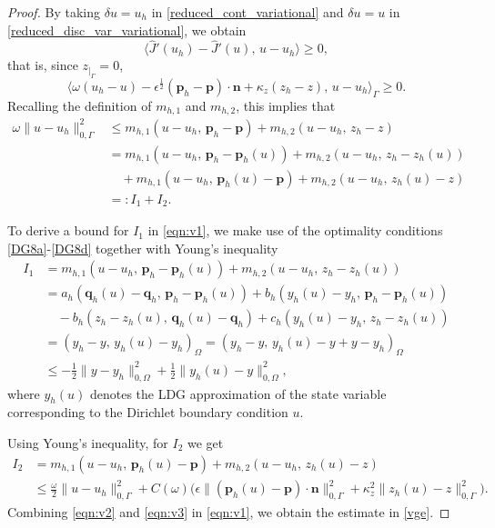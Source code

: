 \documentclass[a4paper,10pt]{article}
\newcommand{\hF}{{\frac{1}{2}}}
\newcommand{\bq}{{\mathbf{q}}}
\newcommand{\bp}{{\mathbf{p}}}
\newcommand{\bn}{{\mathbf{n}}}
\numberwithin{theorem}{section}
\newcommand{\x}[2][blue]{#2}
\begin{document}
\begin{proof}
By taking $\delta u = u_h$ in \eqref{reduced_cont_variational} and $\delta u = u$ in \eqref{reduced_disc_var_variational}, we obtain
\[
\langle \widehat{J}'(u_h) - \widehat{J}'(u),\, u - u_h \rangle \ge 0,
\]
that is, since $z_{|_\Gamma} = 0$,
\[
\langle \omega (u_h - u) - \epsilon^{\hF} (\bp_h - \bp) \cdot \bn + \kappa_z (z_h - z),\, u - u_h \rangle_{\Gamma} \ge 0.
\]
Recalling the definition of $m_{h,1}$ and $m_{h,2}$, this implies that
\begin{align}\label{eqn:v1}
\omega \|u - u_h\|^2_{0,\Gamma}
&\le m_{h,1}(u - u_h,\, \bp_h - \bp) + m_{h,2}(u - u_h,\, z_h - z) \nonumber \\[4pt]
&= m_{h,1}(u - u_h,\, \bp_h - \bp_h(u)) + m_{h,2}(u - u_h,\, z_h - z_h(u)) \nonumber\\
&\quad + m_{h,1}(u - u_h,\, \bp_h(u) - \bp) + m_{h,2}(u - u_h,\, z_h(u) - z) \nonumber \\[4pt]
&=: I_1 + I_2.
\end{align}

To derive a bound for $I_1$ in \eqref{eqn:v1}, we make use of the optimality conditions  \eqref{DG8a}-\eqref{DG8d} together with Young's inequality
\begin{align}\label{eqn:v2}
I_1 
&= m_{h,1}(u - u_h,\, \bp_h - \bp_h(u)) 
   + m_{h,2}(u - u_h,\, z_h - z_h(u)) \nonumber \\[4pt]
&= a_h(\bq_h(u) - \bq_h,\, \bp_h - \bp_h(u)) 
   + b_h(y_h(u) - y_h,\, \bp_h - \bp_h(u)) \nonumber \\
&\quad - b_h(z_h - z_h(u),\, \bq_h(u) - \bq_h) 
   + c_h(y_h(u) - y_h,\, z_h - z_h(u)) \nonumber \\[4pt]
&= (y_h - y,\, y_h(u)- y_h)_{\Omega}  = (y_h - y,\, y_h(u) - y + y - y_h)_{\Omega} \nonumber \\[4pt]
&\le - \frac{1}{2}\|y - y_h\|^2_{0,\Omega} 
   + \frac{1}{2}\|y_h(u) - y\|^2_{0,\Omega},
\end{align}
where $y_h(u)$ denotes the LDG approximation of the state variable corresponding to the Dirichlet boundary condition $u$.


\x{Using Young's inequality, for $I_2$ we get}
\begin{align}\label{eqn:v3}
I_2 
&= m_{h,1}(u - u_h,\, \bp_h(u) - \bp) 
  + m_{h,2}(u - u_h,\, z_h(u) - z) \nonumber \\[4pt]
&\le \frac{\omega}{2} \|u - u_h\|_{0,\Gamma}^2 
   + C(\omega) 
     \big( \epsilon \|(\bp_h(u) - \bp)\cdot\bn \|_{0,\Gamma}^2 
         + \kappa_z^2\|z_h(u) - z\|_{0,\Gamma}^2 \big). 
\end{align}
Combining \eqref{eqn:v2} and \eqref{eqn:v3} in \eqref{eqn:v1}, we obtain the estimate in \eqref{vge}.
\end{proof}
\end{document}
